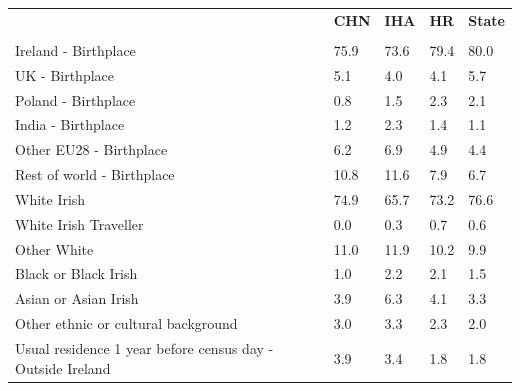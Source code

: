 \documentclass{article}
\begin{document}
\pagebreak
\begin{table}[h]	
\centering
		\begin{tabular}{KTTTT}
  \hline
& \textbf{CHN} & \textbf{IHA} & \textbf{HR}& \textbf{State}\\ 
  \hline
    \\ 
    \hline
Ireland - Birthplace & 75.9& 73.6& 79.4& 80.0\\
UK - Birthplace & 5.1& 4.0& 4.1& 5.7\\
Poland - Birthplace & 0.8& 1.5& 2.3& 2.1\\
India - Birthplace & 1.2& 2.3& 1.4& 1.1\\
Other EU28 - Birthplace & 6.2& 6.9& 4.9& 4.4\\
Rest of world - Birthplace & 10.8& 11.6&  7.9&  6.7\\
    \hline
White Irish & 74.9& 65.7& 73.2& 76.6\\
White Irish Traveller & 0.0& 0.3& 0.7& 0.6\\
Other White & 11.0& 11.9& 10.2&  9.9\\
Black or Black Irish & 1.0& 2.2& 2.1& 1.5\\
Asian or Asian Irish & 3.9& 6.3& 4.1& 3.3\\
Other ethnic or cultural background & 3.0& 3.3& 2.3& 2.0\\
    \hline
Usual residence 1 year before census day - Outside Ireland & 3.9& 3.4& 1.8& 1.8\\


\end{tabular}
\end{table}
\end{document}
